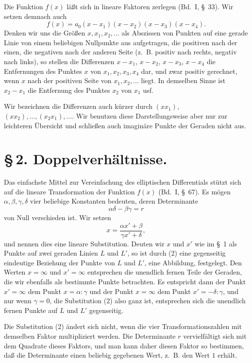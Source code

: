 \documentclass[11pt]{article}
\begin{document}
Die Funktion $f(x)$ läßt sich in lineare Faktoren zerlegen (Bd.~I, \S~33). Wir setzen demnach auch
\[
f(x)=a_0(x-x_1)(x-x_2)(x-x_3)(x-x_4).
\]
Denken wir uns die Größen $x,x_1,x_2,\ldots$ als Abszissen von Punkten auf eine gerade Linie von einem beliebigen Nullpunkte aus aufgetragen, die positiven nach der einen, die negativen nach der anderen Seite (z.~B. positiv nach rechts, negativ nach links), so stellen die Differenzen $x-x_1$, $x-x_2$, $x-x_3$, $x-x_4$ die Entfernungen des Punktes $x$ von $x_1,x_2,x_3,x_4$ dar, und zwar positiv gerechnet, wenn $x$ nach der positiven Seite von $x_1,x_2,\ldots$ liegt. In demselben Sinne ist $x_2-x_1$ die Entfernung des Punktes $x_2$ von $x_1$ usf.

Wir bezeichnen die Differenzen auch kürzer durch $(xx_1)$, $(xx_2),\ldots,(x_2x_1),\ldots$. Wir benutzen diese Darstellungsweise aber nur zur leichteren Übersicht und schließen auch imaginäre Punkte der Geraden nicht aus.

\section*{\S\,2. Doppelverhältnisse.}

Das einfachste Mittel zur Vereinfachung des elliptischen Differentials stützt sich auf die lineare Transformation der Funktion $f(x)$ (Bd.~I, \S~67). Es mögen $\alpha,\beta,\gamma,\delta$ vier beliebige Konstanten bedeuten, deren Determinante
\begin{equation}
\alpha\delta-\beta\gamma=r
\tag{1}
\end{equation}
von Null verschieden ist. Wir setzen
\begin{equation}
x=\frac{\alpha x'+\beta}{\gamma x'+\delta},
\tag{2}
\end{equation}
und nennen dies eine lineare Substitution. Deuten wir $x$ und $x'$ wie im \S~1 als Punkte auf zwei geraden Linien $L$ und $L'$, so ist durch (2) eine gegenseitig eindeutige Beziehung der Punkte von $L$ und $L'$, eine Abbildung, festgelegt. Den Werten $x=\infty$ und $x'=\infty$ entsprechen die unendlich fernen Teile der Geraden, die wir ebenfalls als bestimmte Punkte betrachten. Es entspricht dann der Punkt $x'=\infty$ dem Punkt $x=\alpha:\gamma$ und der Punkt $x=\infty$ dem Punkt $x'=-\delta:\gamma$, und nur wenn $\gamma=0$, die Substitution (2) also ganz ist, entsprechen sich die unendlich fernen Punkte auf $L$ und $L'$ gegenseitig.

Die Substitution (2) ändert sich nicht, wenn die vier Transformationszahlen mit demselben Faktor multipliziert werden. Die Determinante $r$ vervielfältigt sich mit dem Quadrate dieses Faktors, und man kann daher diesen Faktor so bestimmen, daß die Determinante einen beliebig gegebenen Wert, z.~B. den Wert $1$ erhält.
\end{document}
